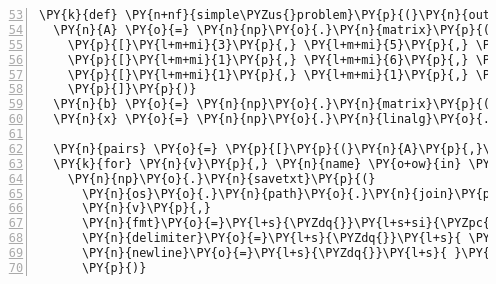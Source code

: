 \begin{Verbatim}[commandchars=\\\{\},numbers=left,numbersep=0.5em,firstnumber=53]
\PY{k}{def} \PY{n+nf}{simple\PYZus{}problem}\PY{p}{(}\PY{n}{outdir}\PY{p}{)}\PY{p}{:}
  \PY{n}{A} \PY{o}{=} \PY{n}{np}\PY{o}{.}\PY{n}{matrix}\PY{p}{(}\PY{p}{[}
    \PY{p}{[}\PY{l+m+mi}{3}\PY{p}{,} \PY{l+m+mi}{5}\PY{p}{,} \PY{l+m+mi}{2}\PY{p}{]}\PY{p}{,}
    \PY{p}{[}\PY{l+m+mi}{1}\PY{p}{,} \PY{l+m+mi}{6}\PY{p}{,} \PY{l+m+mi}{2}\PY{p}{]}\PY{p}{,}
    \PY{p}{[}\PY{l+m+mi}{1}\PY{p}{,} \PY{l+m+mi}{1}\PY{p}{,} \PY{l+m+mi}{1}\PY{p}{]}\PY{p}{,}
    \PY{p}{]}\PY{p}{)}
  \PY{n}{b} \PY{o}{=} \PY{n}{np}\PY{o}{.}\PY{n}{matrix}\PY{p}{(}\PY{p}{[}\PY{l+m+mi}{1}\PY{p}{,}\PY{l+m+mi}{2}\PY{p}{,}\PY{l+m+mi}{3}\PY{p}{]}\PY{p}{)}\PY{o}{.}\PY{n}{T}
  \PY{n}{x} \PY{o}{=} \PY{n}{np}\PY{o}{.}\PY{n}{linalg}\PY{o}{.}\PY{n}{solve}\PY{p}{(}\PY{n}{A}\PY{p}{,} \PY{n}{b}\PY{p}{)}
  
  \PY{n}{pairs} \PY{o}{=} \PY{p}{[}\PY{p}{(}\PY{n}{A}\PY{p}{,}\PY{l+s}{\PYZdq{}}\PY{l+s}{A}\PY{l+s}{\PYZdq{}}\PY{p}{)}\PY{p}{,} \PY{p}{(}\PY{n}{b}\PY{p}{,}\PY{l+s}{\PYZdq{}}\PY{l+s}{b}\PY{l+s}{\PYZdq{}}\PY{p}{)}\PY{p}{,} \PY{p}{(}\PY{n}{x}\PY{p}{,}\PY{l+s}{\PYZdq{}}\PY{l+s}{x}\PY{l+s}{\PYZdq{}}\PY{p}{)}\PY{p}{]}
  \PY{k}{for} \PY{n}{v}\PY{p}{,} \PY{n}{name} \PY{o+ow}{in} \PY{n}{pairs}\PY{p}{:}
    \PY{n}{np}\PY{o}{.}\PY{n}{savetxt}\PY{p}{(}
      \PY{n}{os}\PY{o}{.}\PY{n}{path}\PY{o}{.}\PY{n}{join}\PY{p}{(}\PY{n}{outdir}\PY{p}{,} \PY{l+s}{\PYZdq{}}\PY{l+s}{\PYZob{}\PYZcb{}.tex}\PY{l+s}{\PYZdq{}}\PY{o}{.}\PY{n}{format}\PY{p}{(}\PY{n}{name}\PY{p}{)}\PY{p}{)}\PY{p}{,}
      \PY{n}{v}\PY{p}{,}
      \PY{n}{fmt}\PY{o}{=}\PY{l+s}{\PYZdq{}}\PY{l+s+si}{\PYZpc{}5.3f}\PY{l+s}{\PYZdq{}}\PY{p}{,}
      \PY{n}{delimiter}\PY{o}{=}\PY{l+s}{\PYZdq{}}\PY{l+s}{ \PYZam{} }\PY{l+s}{\PYZdq{}}\PY{p}{,}     \PY{c}{\PYZsh{} These two lines }
      \PY{n}{newline}\PY{o}{=}\PY{l+s}{\PYZdq{}}\PY{l+s}{ }\PY{l+s+se}{\PYZbs{}\PYZbs{}}\PY{l+s+se}{\PYZbs{}\PYZbs{}}\PY{l+s+se}{\PYZbs{}n}\PY{l+s}{\PYZdq{}}\PY{p}{,}   \PY{c}{\PYZsh{} enable latex inputs.}
      \PY{p}{)}
\end{Verbatim}
